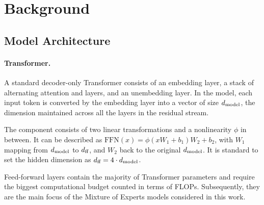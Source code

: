 \section{Background}
\label{background}



\subsection{Model Architecture}

\paragraph{Transformer.} A standard decoder-only Transformer \citep{radford2018improving, noauthororeditor, kaplan2020scaling, brown2020language} consists of an embedding layer, a stack of alternating attention and \ff{} layers, and an unembedding layer. In the model, each input token is converted by the embedding layer into a vector of size $d_\text{model}$, the dimension maintained across all the layers in the residual stream.

The \ff{} component consists of two linear transformations and a nonlinearity $\phi$ in between. It can be described as
    $\text{FFN}(x) = \phi(xW_1+b_1)W_2+b_2$,
with $W_1$ mapping from $d_\text{model}$ to $d_\text{ff}$, and $W_2$ back to the original $d_\text{model}$. It is standard \citep{radford2018improving, rae2022scaling, touvron2023llama, jiang2023mistral} to set the hidden dimension as $d_\text{ff} = 4 \cdot d_\text{model}$. %

Feed-forward layers contain the majority of Transformer parameters and require the biggest computational budget counted in terms of FLOPs. Subsequently, they are the main focus of the Mixture of Experts models considered in this work.

